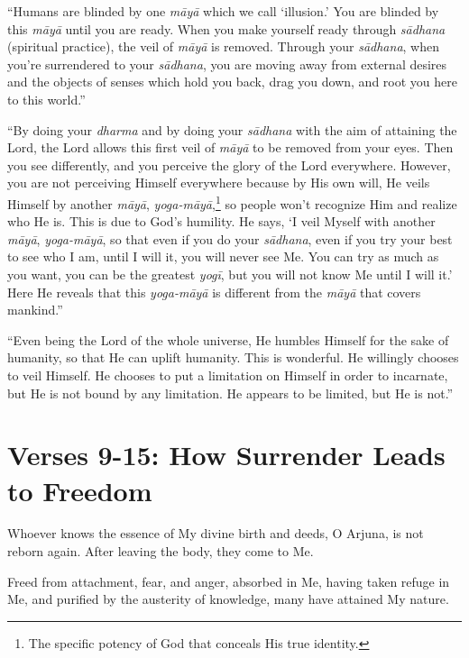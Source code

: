 \enquote{Humans are blinded by one \textit{māyā} which we call \enquote{illusion.} You are blinded by this \textit{māyā} until you are ready. When you make yourself ready through \textit{sādhana} (spiritual practice), the veil of \textit{māyā} is removed. Through your \textit{sādhana}, when you’re surrendered to your \textit{sādhana}, you are moving away from external desires and the objects of senses which hold you back, drag you down, and root you here to this world.}

\enquote{By doing your \textit{dharma} and by doing your \textit{sādhana} with the aim of attaining the Lord, the Lord allows this first veil of \textit{māyā} to be removed from your eyes. Then you see differently, and you perceive the glory of the Lord everywhere. However, you are not perceiving Himself everywhere because by His own will, He veils Himself by another \textit{māyā}, \textit{yoga-māyā},\footnote{The specific potency of God that conceals His true identity.} so people won’t recognize Him and realize who He is. This is due to God’s humility. He says, \enquote{I veil Myself with another \textit{māyā}, \textit{yoga-māyā}, so that even if you do your \textit{sādhana}, even if you try your best to see who I am, until I will it, you will never see Me. You can try as much as you want, you can be the greatest \textit{yogī}, but you will not know Me until I will it.} Here He reveals that this \textit{yoga-māyā} is different from the \textit{māyā} that covers mankind.}

\enquote{Even being the Lord of the whole universe, He humbles Himself for the sake of humanity, so that He can uplift humanity. This is wonderful. He willingly chooses to veil Himself. He chooses to put a limitation on Himself in order to incarnate, but He is not bound by any limitation. He appears to be limited, but He is not.}

\section{Verses 9-15: How Surrender Leads to Freedom}\label{sec-verses-9-15-how-surrender-leads-to-freedom}
{Whoever knows the essence of My divine birth and deeds, O Arjuna, is not reborn again. After leaving the body, they come to Me.}

{Freed from attachment, fear, and anger, absorbed in Me, having taken refuge in Me, and purified by the austerity of knowledge, many have attained My nature.}

